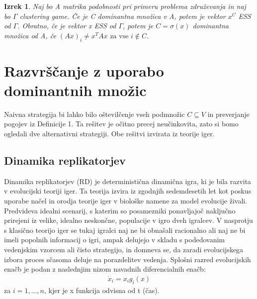 \documentclass[a4paper]{article}
\newtheorem{theorem}{Izrek}
\begin{document}

\begin{theorem}
Naj bo A matrika podobnosti pri primeru problema združevanja in naj bo $\Gamma$ \textit{clustering game}. Če je C dominantna množica v A, potem je vektor $x^C$ ESS od $\Gamma$. Obratno, če je vektor x ESS od $\Gamma$, potem je $C=\sigma(x)$ dominantna množica od A, če $(Ax)_i\not=x^TAx \text{ za vse } i \not\in C$.
\end{theorem}

\section{Razvrščanje z uporabo dominantnih množic}
Naivna strategija bi lahko bilo oštevilčenje vseh podmnožic $C\subseteq V$ in preverjanje pogojev iz Definicije 1. Ta rešitev je očitno precej neučinkovita, zato si bomo ogledali dve alternativni strategiji. Obe rešitvi izvirata iz teorije iger.

\subsection{Dinamika replikatorjev}
Dinamika replikatorjev (RD) je deterministična dinamična igra, ki je bila razvita v evolucijski teoriji iger. Ta teorija izvira iz zgodnjih sedemdesetih let kot poskus uporabe načel in orodja teorije iger v biološke namene za model evolucije živali. Predvideva idealni scenarij, s katerim so posamezniki ponavljajoč naključno prirejeni iz velike, idealno neskončne, populacije v igro dveh igralcev. V nasprotju s klasično teorijo iger se tukaj igralci naj ne bi obnašali racionalno ali naj ne bi imeli popolnih informacij o igri, ampak delujejo v skladu s podedovanim vedenjskim vzorcem ali čisto strategijo, in domneva se, da zaradi evolucijskega izbora proces sčasoma deluje na porazdelitev vedenja. Splošni razred evolucijskih enačb je podan z naslednjim nizom navadnih diferencialnih enačb:
\begin{gather}
\dot{x}_i = x_i g_i (x)
\end{gather}
za $i = 1,\ldots,n$, kjer je x funkcija odvisna od t (čas).
\end{document}
